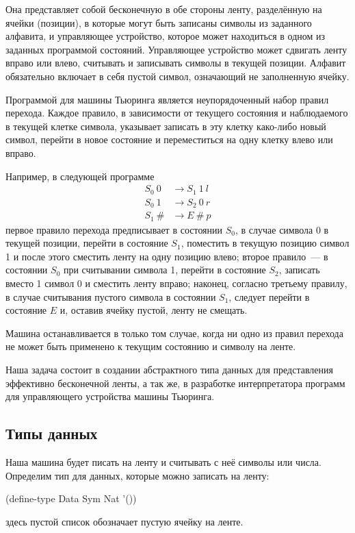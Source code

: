 Она представляет собой бесконечную в обе стороны ленту, разделённую на ячейки (позиции), в которые могут быть записаны символы из заданного алфавита, и управляющее устройство, которое может находиться в одном из заданных программой состояний. Управляющее устройство может сдвигать ленту вправо или влево, считывать и записывать символы в текущей позиции. Алфавит обязательно включает в себя пустой символ, означающий не заполненную ячейку.

Программой для машины Тьюринга является неупорядоченный набор правил перехода. Каждое правило, в зависимости от текущего состояния и наблюдаемого в текущей клетке символа, указывает записать в эту клетку како-либо новый символ, перейти в новое состояние и переместиться на одну клетку влево или вправо. 

Например, в следующей программе
\label{TM-prog}
\begin{align*}
S_0~0 &\to S_1~1~l\\
S_0~1 &\to S_2~0~r\\
S_1~\# &\to E~\#~p
\end{align*}
первое правило перехода предписывает в состоянии $S_0$, в случае символа 0 в текущей позиции, перейти в состояние $S_1$, поместить в текущую позицию символ 1 и после этого сместить ленту на одну позицию влево; второе правило~--- в состоянии $S_0$ при считывании символа 1, перейти в состояние $S_2$, записать вместо 1 символ 0 и сместить ленту вправо; наконец, согласно третьему правилу, в случае считывания пустого символа в состоянии $S_1$, следует перейти в состояние $E$ и, оставив ячейку пустой, ленту не смещать.

Машина останавливается в только том случае, когда ни одно из правил перехода не может быть применено к текущим состоянию и символу на ленте.

Наша задача состоит в создании абстрактного типа данных для представления эффективно бесконечной ленты, а так же, в разработке интерпретатора программ для управляющего устройства машины Тьюринга.


\subsection*{Типы данных}

Наша машина будет писать на ленту и считывать с неё символы или числа. Определим тип для данных, которые можно записать на ленту:
\begin{SchemeCode}
(define-type Data Sym Nat '())
\end{SchemeCode}
\noindent здесь пустой список обозначает пустую ячейку на ленте.

